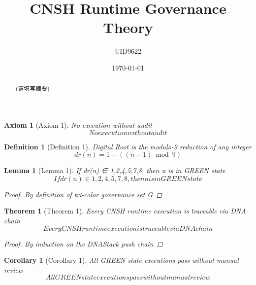 \documentclass{article}
\title{CNSH Runtime Governance Theory}
\author{UID9622}
\date{\today}
\begin{document}
\maketitle

\begin{abstract}
(请填写摘要)
\end{abstract}

\newtheorem{definition}{Definition}
\newtheorem{axiom}{Axiom}
\newtheorem{lemma}{Lemma}
\newtheorem{theorem}{Theorem}
\newtheorem{corollary}{Corollary}

\begin{axiom}[Axiom 1]
No execution without audit
\begin{equation}
No execution without audit
\end{equation}
\end{axiom}

\begin{definition}[Definition 1]
Digital Root is the modulo-9 reduction of any integer
\begin{equation}
dr(n)=1+((n-1) \bmod 9)
\end{equation}
\end{definition}

\begin{lemma}[Lemma 1]
If dr(n) ∈ {1,2,4,5,7,8}, then n is in GREEN state
\begin{equation}
If dr(n) ∈ {1,2,4,5,7,8}, then n is in GREEN state
\end{equation}
\begin{proof}
By definition of tri-color governance set G
\end{proof}
\end{lemma}

\begin{theorem}[Theorem 1]
Every CNSH runtime execution is traceable via DNA chain
\begin{equation}
Every CNSH runtime execution is traceable via DNA chain
\end{equation}
\begin{proof}
By induction on the DNAStack push chain
\end{proof}
\end{theorem}

\begin{corollary}[Corollary 1]
All GREEN state executions pass without manual review
\begin{equation}
All GREEN state executions pass without manual review
\end{equation}
\end{corollary}
\end{document}
